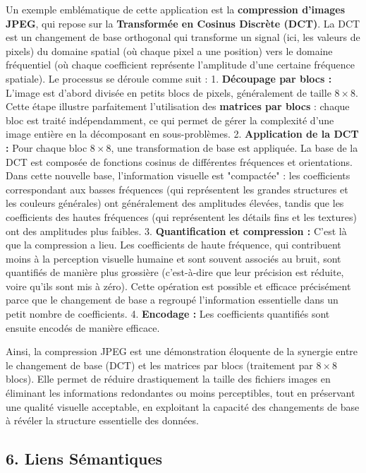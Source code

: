 \documentclass{report}
\begin{document}
Un exemple emblématique de cette application est la \textbf{compression d'images JPEG}, qui repose sur la \textbf{Transformée en Cosinus Discrète (DCT)}. La DCT est un changement de base orthogonal qui transforme un signal (ici, les valeurs de pixels) du domaine spatial (où chaque pixel a une position) vers le domaine fréquentiel (où chaque coefficient représente l'amplitude d'une certaine fréquence spatiale).
Le processus se déroule comme suit :
1.  \textbf{Découpage par blocs :} L'image est d'abord divisée en petits blocs de pixels, généralement de taille $8 \times 8$. Cette étape illustre parfaitement l'utilisation des \textbf{matrices par blocs} : chaque bloc est traité indépendamment, ce qui permet de gérer la complexité d'une image entière en la décomposant en sous-problèmes.
2.  \textbf{Application de la DCT :} Pour chaque bloc $8 \times 8$, une transformation de base est appliquée. La base de la DCT est composée de fonctions cosinus de différentes fréquences et orientations. Dans cette nouvelle base, l'information visuelle est "compactée" : les coefficients correspondant aux basses fréquences (qui représentent les grandes structures et les couleurs générales) ont généralement des amplitudes élevées, tandis que les coefficients des hautes fréquences (qui représentent les détails fins et les textures) ont des amplitudes plus faibles.
3.  \textbf{Quantification et compression :} C'est là que la compression a lieu. Les coefficients de haute fréquence, qui contribuent moins à la perception visuelle humaine et sont souvent associés au bruit, sont quantifiés de manière plus grossière (c'est-à-dire que leur précision est réduite, voire qu'ils sont mis à zéro). Cette opération est possible et efficace précisément parce que le changement de base a regroupé l'information essentielle dans un petit nombre de coefficients.
4.  \textbf{Encodage :} Les coefficients quantifiés sont ensuite encodés de manière efficace.

Ainsi, la compression JPEG est une démonstration éloquente de la synergie entre le changement de base (DCT) et les matrices par blocs (traitement par $8 \times 8$ blocs). Elle permet de réduire drastiquement la taille des fichiers images en éliminant les informations redondantes ou moins perceptibles, tout en préservant une qualité visuelle acceptable, en exploitant la capacité des changements de base à révéler la structure essentielle des données.

\subsection*{6. Liens Sémantiques}
\end{document}
